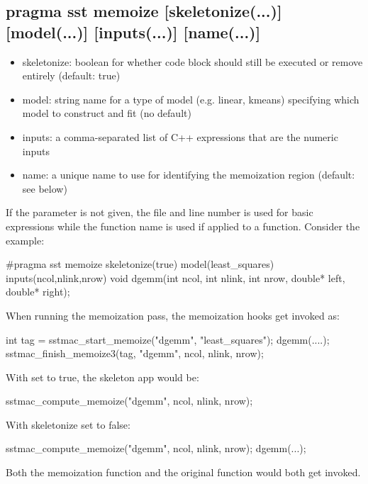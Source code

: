 \begin{CppCode}
struct least_squares : public regression model {
 FactoryRegister("least_squares", operating_system::regression_model, least_squares)
\end{CppCode}

\subsection{pragma sst memoize [skeletonize(...)] [model(...)] [inputs(...)] [name(...)]}
\begin{itemize}
\item skeletonize: boolean for whether code block should still be executed or remove entirely (default: true)
\item model: string name for a type of model (e.g. linear, kmeans) specifying which model to construct and fit (no default)
\item inputs: a comma-separated list of C++ expressions that are the numeric inputs
\item name: a unique name to use for identifying the memoization region (default: see below)
\end{itemize}
If the  parameter is not given, the file and line number is used for basic expressions while the function name is used if applied to a function.
Consider the example:

\begin{CppCode}
#pragma sst memoize skeletonize(true) model(least_squares) inputs(ncol,nlink,nrow) 
void dgemm(int ncol, int nlink, int nrow, double* left, double* right);
\end{CppCode}
When running the memoization pass, the memoization hooks get invoked as:

\begin{CppCode}
int tag = sstmac_start_memoize("dgemm", "least_squares");
dgemm(....);
sstmac_finish_memoize3(tag, "dgemm", ncol, nlink, nrow);
\end{CppCode}
With  set to true, the skeleton app would be:

\begin{CppCode}
sstmac_compute_memoize("dgemm", ncol, nlink, nrow);
\end{CppCode}
With skeletonize set to false:

\begin{CppCode}
sstmac_compute_memoize("dgemm", ncol, nlink, nrow);
dgemm(...);
\end{CppCode}
Both the memoization function and the original function would both get invoked.

